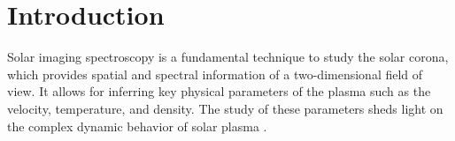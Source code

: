 \documentclass[linenumbers,twocolumn]{aastex7}
\begin{document}


\section{Introduction} \label{sec:intro}

Solar imaging spectroscopy is a fundamental technique to study the solar
corona, which provides spatial and spectral information of a two-dimensional 
field of view. It allows for inferring key physical parameters of the plasma 
such as the velocity, temperature, and density. The study of these parameters
sheds light on the complex dynamic behavior of solar plasma
\citep{phillips2012ultraviolet, rybicki2008radiative}. 




\end{document}
